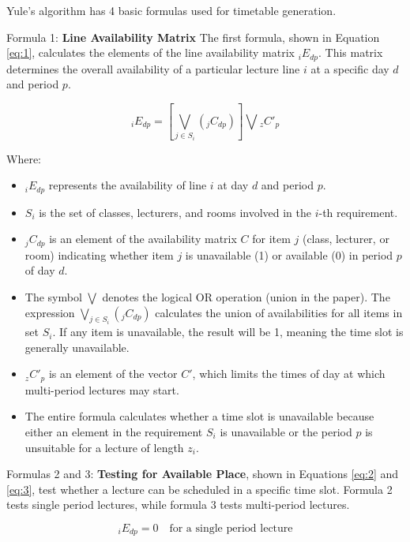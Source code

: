 Yule's algorithm has 4 basic formulas used for timetable generation.

Formula 1: \textbf{Line Availability Matrix} The first formula, shown in Equation \ref{eq:1}, calculates the elements of the line availability matrix \( _iE_{dp} \).
This matrix determines the overall availability of a particular lecture line \( i \) at a specific day \( d \) and period \( p \).

\begin{equation}
\label{eq:1}
_iE_{dp} = \left[\bigvee_{j \in S_i} (_jC_{dp})\right] \bigvee {}_zC'_{p}
\end{equation}

Where:
\begin{itemize}
    \item \( _iE_{dp} \) represents the availability of line \( i \) at day \( d \) and period \( p \).
    \item \( S_i \) is the set of classes, lecturers, and rooms involved in the \( i \)-th requirement.
    \item \( _jC_{dp} \) is an element of the availability matrix \( C \) for item \( j \) (class, lecturer, or room) indicating whether item \( j \) is unavailable (1) or available (0) in period \( p \) of day \( d \).
    \item The symbol \(\bigvee\) denotes the logical OR operation (union in the paper).
	The expression \(\bigvee_{j \in S_i} (_jC_{dp})\) calculates the union of availabilities for all items in set \( S_i \).
	If any item is unavailable, the result will be 1, meaning the time slot is generally unavailable.
    \item \( _zC'_{p} \) is an element of the vector \( C' \), which limits the times of day at which multi-period lectures may start. 
    \item The entire formula calculates whether a time slot is unavailable because either an element in the requirement \( S_i \) is unavailable or the period \( p \) is unsuitable for a lecture of length \( z_i \).
\end{itemize}

Formulas 2 and 3: \textbf{Testing for Available Place}, shown in Equations \ref{eq:2} and \ref{eq:3}, test whether a lecture can be scheduled in a specific time slot.
Formula 2 tests single period lectures, while formula 3 tests multi-period lectures.

\begin{equation}
\label{eq:2}
_iE_{dp} = 0 \quad \text{for a single period lecture}
\end{equation}


